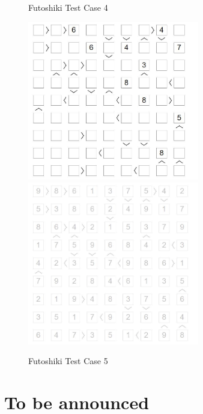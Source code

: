 \documentclass{article}
\begin{document}
\begin{enumerate}
\begin{figure}[htbp]
    \caption{Futoshiki Test Case 4}
    \label{fig:case44}
  \end{figure}
        \begin{figure}[htbp]
    \centering
    \includegraphics[width=7.5cm]{Pic/f5}
    \qquad
    \includegraphics[width=7.5cm]{Pic/f5s}
    \caption{Futoshiki Test Case 5}
    \label{fig:case55}
  \end{figure}

\end{enumerate}

\section{To be announced}
\end{document}
